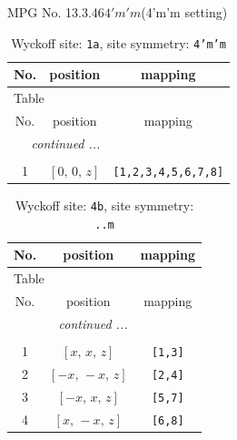 \documentclass[fleqn,8pt]{jsarticle}
\begin{document}
\setcounter{MaxMatrixCols}{32}

\renewcommand{\tablename}{Table~}
\renewcommand{\figurename}{Figure~}
\begin{center}
\LARGE
MPG No. 13.3.46\quad$4'm'm$\quad(4'm'm setting)
\end{center}
\renewcommand{\arraystretch}{1.2}
\begin{longtable}{ccc}
\caption{Wyckoff site: {\tt 1a}, site symmetry: {\tt 4'm'm}}
 \\
 \hline \hline
No. & position & mapping \\ \hline \endfirsthead

\multicolumn{2}{l}{\tablename\ \thetable{}} \\
 \hline \hline
No. & position & mapping \\ \hline \endhead

 \hline \hline
\multicolumn{2}{r}{\footnotesize\it continued ...} \\ \endfoot

 \hline \hline
\multicolumn{2}{r}{} \\ \endlastfoot

1 & $\left[ 0,\, 0,\, z \right]$ & {\tt [1,2,3,4,5,6,7,8]} \\
\end{longtable}
\renewcommand{\arraystretch}{1.2}
\begin{longtable}{ccc}
\caption{Wyckoff site: {\tt 4b}, site symmetry: {\tt ..m}}
 \\
 \hline \hline
No. & position & mapping \\ \hline \endfirsthead

\multicolumn{2}{l}{\tablename\ \thetable{}} \\
 \hline \hline
No. & position & mapping \\ \hline \endhead

 \hline \hline
\multicolumn{2}{r}{\footnotesize\it continued ...} \\ \endfoot

 \hline \hline
\multicolumn{2}{r}{} \\ \endlastfoot

1 & $\left[ x,\, x,\, z \right]$ & {\tt [1,3]} \\ \hline
2 & $\left[ - x,\, - x,\, z \right]$ & {\tt [2,4]} \\ \hline
3 & $\left[ - x,\, x,\, z \right]$ & {\tt [5,7]} \\ \hline
4 & $\left[ x,\, - x,\, z \right]$ & {\tt [6,8]} \\
\end{longtable}
\end{document}
